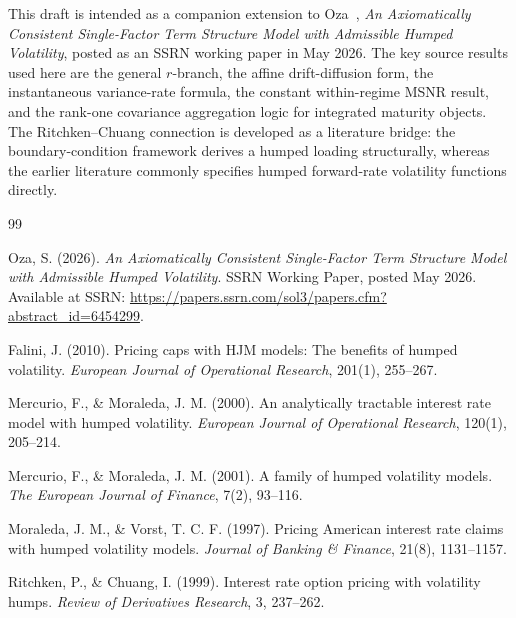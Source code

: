 \documentclass[11pt]{article}
\numberwithin{equation}{section}
\begin{document}
This draft is intended as a companion extension to Oza~\cite{Oza2026IRFR}, \emph{An Axiomatically Consistent Single-Factor Term Structure Model with Admissible Humped Volatility}, posted as an SSRN working paper in May 2026. The key source results used here are the general $r$-branch, the affine drift-diffusion form, the instantaneous variance-rate formula, the constant within-regime MSNR result, and the rank-one covariance aggregation logic for integrated maturity objects. The Ritchken--Chuang connection is developed as a literature bridge: the boundary-condition framework derives a humped loading structurally, whereas the earlier literature commonly specifies humped forward-rate volatility functions directly.

\begin{thebibliography}{99}

Oza, S. (2026).
\emph{An Axiomatically Consistent Single-Factor Term Structure Model with Admissible Humped Volatility}.
SSRN Working Paper, posted May 2026.
Available at SSRN: \url{https://papers.ssrn.com/sol3/papers.cfm?abstract_id=6454299}.

Falini, J. (2010).
Pricing caps with HJM models: The benefits of humped volatility.
\emph{European Journal of Operational Research}, 201(1), 255--267.

Mercurio, F., \& Moraleda, J. M. (2000).
An analytically tractable interest rate model with humped volatility.
\emph{European Journal of Operational Research}, 120(1), 205--214.

Mercurio, F., \& Moraleda, J. M. (2001).
A family of humped volatility models.
\emph{The European Journal of Finance}, 7(2), 93--116.

Moraleda, J. M., \& Vorst, T. C. F. (1997).
Pricing American interest rate claims with humped volatility models.
\emph{Journal of Banking \& Finance}, 21(8), 1131--1157.

Ritchken, P., \& Chuang, I. (1999).
Interest rate option pricing with volatility humps.
\emph{Review of Derivatives Research}, 3, 237--262.

\end{thebibliography}
\end{document}
